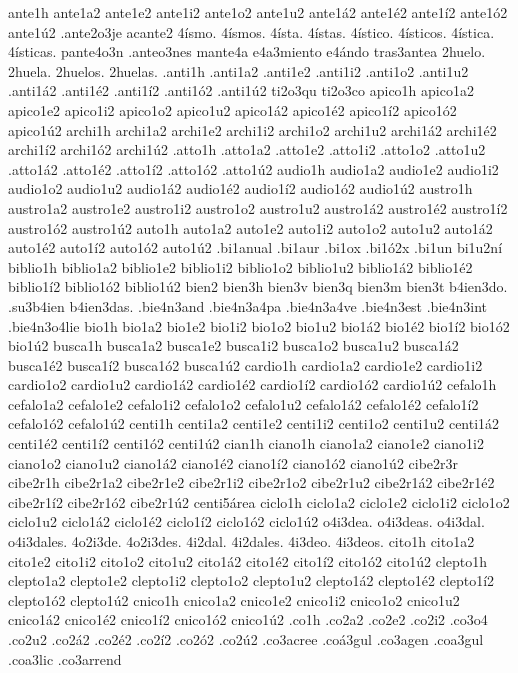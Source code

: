 {ante1h
ante1a2 ante1e2 ante1i2 ante1o2 ante1u2
ante1á2 ante1é2 ante1í2 ante1ó2 ante1ú2
.ante2o3je
acante2
4ísmo.
4ísmos.
4ísta.
4ístas.
4ístico.
4ísticos.
4ística.
4ísticas.
pante4o3n
.anteo3nes
mante4a
e4a3miento
e4ándo
tras3antea
2huelo.
2huela.
2huelos.
2huelas.
.anti1h
.anti1a2 .anti1e2 .anti1i2 .anti1o2 .anti1u2
.anti1á2 .anti1é2 .anti1í2 .anti1ó2 .anti1ú2
ti2o3qu
ti2o3co
apico1h
apico1a2 apico1e2 apico1i2 apico1o2 apico1u2
apico1á2 apico1é2 apico1í2 apico1ó2 apico1ú2
archi1h
archi1a2 archi1e2 archi1i2 archi1o2 archi1u2
archi1á2 archi1é2 archi1í2 archi1ó2 archi1ú2
.atto1h
.atto1a2 .atto1e2 .atto1i2 .atto1o2 .atto1u2
.atto1á2 .atto1é2 .atto1í2 .atto1ó2 .atto1ú2
audio1h
audio1a2 audio1e2 audio1i2 audio1o2 audio1u2
audio1á2 audio1é2 audio1í2 audio1ó2 audio1ú2
austro1h
austro1a2 austro1e2 austro1i2 austro1o2 austro1u2
austro1á2 austro1é2 austro1í2 austro1ó2 austro1ú2
auto1h
auto1a2 auto1e2 auto1i2 auto1o2 auto1u2
auto1á2 auto1é2 auto1í2 auto1ó2 auto1ú2
.bi1anual
.bi1aur
.bi1ox
.bi1ó2x
.bi1un
bi1u2ní
biblio1h
biblio1a2 biblio1e2 biblio1i2 biblio1o2 biblio1u2
biblio1á2 biblio1é2 biblio1í2 biblio1ó2 biblio1ú2
bien2
bien3h
bien3v
bien3q
bien3m
bien3t
b4ien3do.
.su3b4ien
b4ien3das.
.bie4n3and
.bie4n3a4pa
.bie4n3a4ve
.bie4n3est
.bie4n3int
.bie4n3o4lie
bio1h
bio1a2 bio1e2 bio1i2 bio1o2 bio1u2
bio1á2 bio1é2 bio1í2 bio1ó2 bio1ú2
busca1h
busca1a2 busca1e2 busca1i2 busca1o2 busca1u2
busca1á2 busca1é2 busca1í2 busca1ó2 busca1ú2
cardio1h
cardio1a2 cardio1e2 cardio1i2 cardio1o2 cardio1u2
cardio1á2 cardio1é2 cardio1í2 cardio1ó2 cardio1ú2
cefalo1h
cefalo1a2 cefalo1e2 cefalo1i2 cefalo1o2 cefalo1u2
cefalo1á2 cefalo1é2 cefalo1í2 cefalo1ó2 cefalo1ú2
centi1h
centi1a2 centi1e2 centi1i2 centi1o2 centi1u2
centi1á2 centi1é2 centi1í2 centi1ó2 centi1ú2
cian1h
ciano1h
ciano1a2 ciano1e2 ciano1i2 ciano1o2 ciano1u2
ciano1á2 ciano1é2 ciano1í2 ciano1ó2 ciano1ú2
cibe2r3r
cibe2r1h
cibe2r1a2 cibe2r1e2 cibe2r1i2 cibe2r1o2 cibe2r1u2
cibe2r1á2 cibe2r1é2 cibe2r1í2 cibe2r1ó2 cibe2r1ú2
centi5área
ciclo1h
ciclo1a2 ciclo1e2 ciclo1i2 ciclo1o2 ciclo1u2
ciclo1á2 ciclo1é2 ciclo1í2 ciclo1ó2 ciclo1ú2
o4i3dea.
o4i3deas.
o4i3dal.
o4i3dales.
4o2i3de.
4o2i3des.
4i2dal.
4i2dales.
4i3deo.
4i3deos.
cito1h
cito1a2 cito1e2 cito1i2 cito1o2 cito1u2
cito1á2 cito1é2 cito1í2 cito1ó2 cito1ú2
clepto1h
clepto1a2 clepto1e2 clepto1i2 clepto1o2 clepto1u2
clepto1á2 clepto1é2 clepto1í2 clepto1ó2 clepto1ú2
cnico1h
cnico1a2 cnico1e2 cnico1i2 cnico1o2 cnico1u2
cnico1á2 cnico1é2 cnico1í2 cnico1ó2 cnico1ú2
.co1h
.co2a2
.co2e2
.co2i2
.co3o4
.co2u2
.co2á2
.co2é2
.co2í2
.co2ó2
.co2ú2
.co3acree
.coá3gul
.co3agen
.coa3gul
.coa3lic
.co3arrend
}
